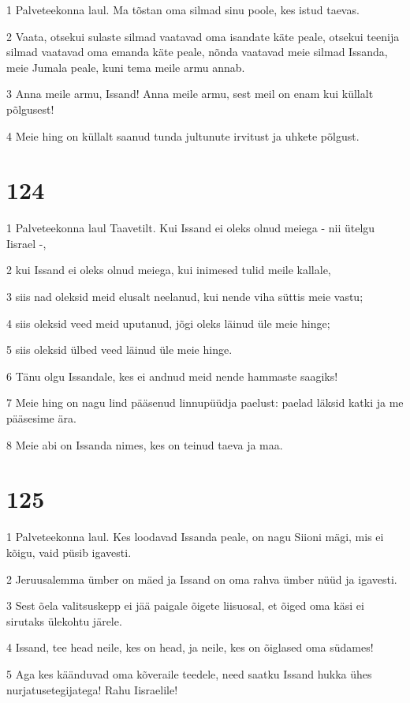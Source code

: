 \par 1 Palveteekonna laul. Ma tõstan oma silmad sinu poole, kes istud taevas.
\par 2 Vaata, otsekui sulaste silmad vaatavad oma isandate käte peale, otsekui teenija silmad vaatavad oma emanda käte peale, nõnda vaatavad meie silmad Issanda, meie Jumala peale, kuni tema meile armu annab.
\par 3 Anna meile armu, Issand! Anna meile armu, sest meil on enam kui küllalt põlgusest!
\par 4 Meie hing on küllalt saanud tunda jultunute irvitust ja uhkete põlgust.

\chapter{124}

\par 1 Palveteekonna laul Taavetilt. Kui Issand ei oleks olnud meiega - nii ütelgu Iisrael -,
\par 2 kui Issand ei oleks olnud meiega, kui inimesed tulid meile kallale,
\par 3 siis nad oleksid meid elusalt neelanud, kui nende viha süttis meie vastu;
\par 4 siis oleksid veed meid uputanud, jõgi oleks läinud üle meie hinge;
\par 5 siis oleksid ülbed veed läinud üle meie hinge.
\par 6 Tänu olgu Issandale, kes ei andnud meid nende hammaste saagiks!
\par 7 Meie hing on nagu lind pääsenud linnupüüdja paelust: paelad läksid katki ja me pääsesime ära.
\par 8 Meie abi on Issanda nimes, kes on teinud taeva ja maa.

\chapter{125}

\par 1 Palveteekonna laul. Kes loodavad Issanda peale, on nagu Siioni mägi, mis ei kõigu, vaid püsib igavesti.
\par 2 Jeruusalemma ümber on mäed ja Issand on oma rahva ümber nüüd ja igavesti.
\par 3 Sest õela valitsuskepp ei jää paigale õigete liisuosal, et õiged oma käsi ei sirutaks ülekohtu järele.
\par 4 Issand, tee head neile, kes on head, ja neile, kes on õiglased oma südames!
\par 5 Aga kes käänduvad oma kõveraile teedele, need saatku Issand hukka ühes nurjatusetegijatega! Rahu Iisraelile!

